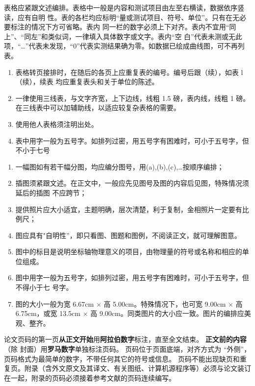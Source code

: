 表格应紧跟文述编排。表格中一般是内容和测试项目由左至右横读，数据依序竖读，应有自明 性。表的各栏均应标明“量或测试项目、符号、单位”。只有在无必要标注的情况下方可省略。表内 同一栏的数字必须上下对齐。表内不宜用“同上”、“同左”和类似词，一律填入具体数字或文字。表内“空 白”代表未测或无此项，“…”代表未发现，“0”代表实测结果确为零。如数据已绘成曲线图，可不再列 表。

\begin{enumerate}[wide, label=\arabic*),  labelindent=21pt]
    \item 表格转页接排时，在随后的各页上应重复表的编号。编号后跟（续），如表 l（续），续表
均应重复表头和关于单位的陈述。
    \item 一律使用三线表，与文字齐宽，上下边线，线粗 1.5 磅，表内线，线粗 1 磅。在三线表中可以加辅助线，以适应较复杂表格的需要。
    \item 使用他人表格须注明出处。
    \item 表中用字一般为五号字。如排列过密，用五号字有困难时，可小于五号字，但不小于七号
\end{enumerate}



\begin{enumerate}[wide, label=\arabic*),  labelindent=21pt]
    \item 一幅图如有若干幅分图，均应编分图号，用(a),(b),(c),…按顺序编排；
    \item 插图须紧跟文述。在正文中，一般应先见图号及图的内容后见图，特殊情况须延后的插图
不应跨节； 
    \item 提供照片应大小适宜，主题明确，层次清楚，利于复制，金相照片一定要有比例尺；
    \item 图应具有"自明性”，即只看图、图题和图例，不阅读正文，就可理解图意。
    \item 图中的标目是说明坐标轴物理意义的项目，由物理量的符号或名称和相应的单位组成。
    \item 图中用字一般为五号字，如排列过密，用五号字有困难时，可小于五号字，但不得小于七
号字。 
    \item 图的大小一般为宽 6.67cm $\times$ 高 5.00cm。特殊情况下，也可宽 9.00cm $\times$ 高 6.75cm，或宽 13.5cm
$\times$ 高 9.00cm。同类图片的大小应一致。图片的编排应美观、整齐。
\end{enumerate}




论文页码的第一页\textbf{从正文开始}用\textbf{阿拉伯数字}标注，直至全文结束。
\textbf{正文前的内容}（除 封面）用\textbf{罗马数字}单独标注页码。
页码位于页面底端，对齐方式为 “外侧”，页码格式为最简单的数字，不带任何其它的符号或信息。
页码不能出现缺页和重复页。附录（含外文原文及其译文、有关图纸、计算机源程序等）必须与论文装订在一起，附录的页码必须接着参考文献的页码连续编写。